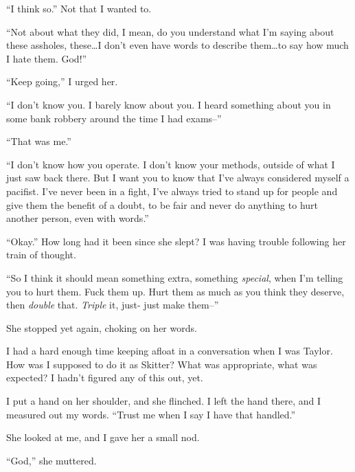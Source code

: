 ``I think so.''  Not that I wanted to.



``Not about what they did, I mean, do you understand what I'm saying about these assholes, these\ldots I don't even have words to describe them\ldots to say how much I hate them.  God!''



``Keep going,'' I urged her.



``I don't know you.  I barely know about you.  I heard something about you in some bank robbery around the time I had exams--''



``That was me.''



``I don't know how you operate.  I don't know your methods, outside of what I just saw back there.  But I want you to know that I've always considered myself a pacifist.  I've never been in a fight, I've always tried to stand up for people and give them the benefit of a doubt, to be fair and never do anything to hurt another person, even with words.''



``Okay.''  How long had it been since she slept?  I was having trouble following her train of thought.



``So I think it should mean something extra, something \emph{special}, when I'm telling you to hurt them.  Fuck them up.  Hurt them as much as you think they deserve, then \emph{double} that.  \emph{Triple} it, just- just make them--''



She stopped yet again, choking on her words.



I had a hard enough time keeping afloat in a conversation when I was Taylor.  How was I supposed to do it as Skitter?  What was appropriate, what was expected?  I hadn't figured any of this out, yet.



I put a hand on her shoulder, and she flinched.  I left the hand there, and I measured out my words.  ``Trust me when I say I have that handled.''



She looked at me, and I gave her a small nod.



``God,'' she muttered.



